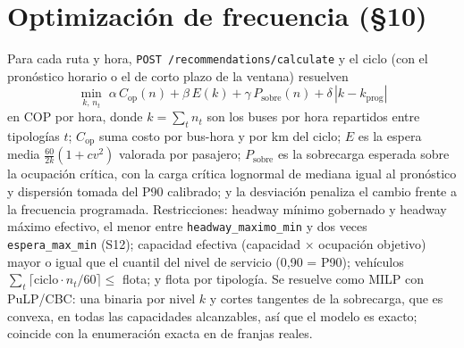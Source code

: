 \documentclass[10pt,a4paper]{article}
\begin{document}
\section{Optimización de frecuencia (§10)}
\label{sec:optimizacion}
Para cada ruta y hora, \texttt{POST /recommendations/calculate} y el ciclo (con el pronóstico horario o el de corto
plazo de la ventana) resuelven
\[
\min_{k,\,n_t}\; \alpha\,C_{\text{op}}(n) + \beta\,E(k) + \gamma\,P_{\text{sobre}}(n) + \delta\,|k-k_{\text{prog}}|
\]
en COP por hora, donde $k=\sum_t n_t$ son los buses por hora repartidos entre tipologías $t$; $C_{\text{op}}$ suma
costo por bus-hora y por km del ciclo; $E$ es la espera media $\tfrac{60}{2k}(1+cv^2)$ valorada por pasajero;
$P_{\text{sobre}}$ es la sobrecarga esperada sobre la ocupación crítica, con la carga crítica lognormal de mediana igual al
pronóstico y dispersión tomada del P90 calibrado; y la desviación penaliza el cambio frente a la frecuencia programada.
Restricciones: headway mínimo gobernado y headway máximo efectivo, el menor entre \texttt{headway\_maximo\_min} y dos
veces \texttt{espera\_max\_min} (S12); capacidad efectiva (capacidad × ocupación objetivo) mayor o igual que el cuantil
del nivel de servicio (0,90 = P90); vehículos $\sum_t \lceil \text{ciclo}\cdot n_t/60\rceil \le$ flota; y flota por
tipología. Se resuelve como MILP con PuLP/CBC: una binaria por nivel $k$ y cortes tangentes de la sobrecarga, que es
convexa, en todas las capacidades alcanzables, así que el modelo es exacto; coincide con la enumeración exacta en
\FranjasMilpIgual{} de \FranjasTotal{} franjas reales.
\end{document}
